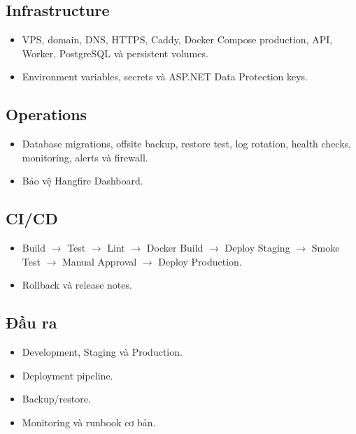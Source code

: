 \documentclass[
  11pt,
  a4paper,
]{article}
\begin{document}
\subsection{Infrastructure}\label{infrastructure-1}

\begin{itemize}
\item
  VPS, domain, DNS, HTTPS, Caddy, Docker Compose production, API,
  Worker, PostgreSQL và persistent volumes.
\item
  Environment variables, secrets và ASP.NET Data Protection keys.
\end{itemize}

\subsection{Operations}\label{operations}

\begin{itemize}
\item
  Database migrations, offsite backup, restore test, log rotation,
  health checks, monitoring, alerts và firewall.
\item
  Bảo vệ Hangfire Dashboard.
\end{itemize}

\subsection{CI/CD}\label{cicd}

\begin{itemize}
\item
  Build \(\rightarrow\) Test \(\rightarrow\) Lint \(\rightarrow\) Docker Build \(\rightarrow\) Deploy Staging \(\rightarrow\) Smoke Test \(\rightarrow\)
  Manual Approval \(\rightarrow\) Deploy Production.
\item
  Rollback và release notes.
\end{itemize}

\subsection{Đầu ra}\label{ux111ux1ea7u-ra-14}

\begin{itemize}
\item
  Development, Staging và Production.
\item
  Deployment pipeline.
\item
  Backup/restore.
\item
  Monitoring và runbook cơ bản.
\end{itemize}
\end{document}
